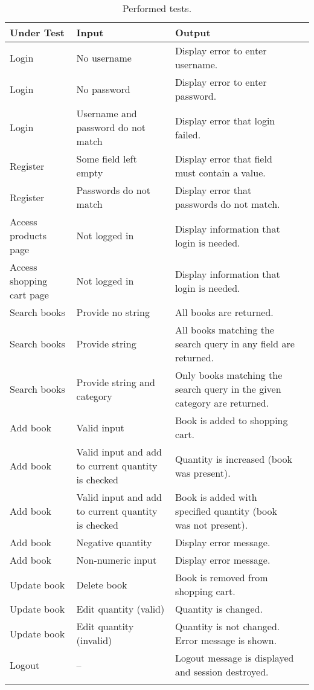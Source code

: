 \begin{longtable}{X X X X}
\hline Under Test & Input & Output \\
\hline 
\hline Login & No username & Display error to enter username. \\
\hline Login & No password & Display error to enter password. \\
\hline Login & Username and password do not match & Display error that login failed. \\
\hline Register & Some field left empty & Display error that field must contain a value. \\
\hline Register & Passwords do not match & Display error that passwords do not match. \\
\hline Access products page & Not logged in & Display information that login is needed. \\
\hline Access shopping cart page & Not logged in & Display information that login is needed. \\
\hline Search books & Provide no string & All books are returned. \\
\hline Search books & Provide string & All books matching the search query in any field are returned. \\
\hline Search books & Provide string and category & Only books matching the search query in the given category are returned. \\
\hline Add book & Valid input & Book is added to shopping cart. \\
\hline Add book & Valid input and add to current quantity is checked & Quantity is increased (book was present). \\
\hline Add book & Valid input and add to current quantity is checked & Book is added with specified quantity (book was not present). \\
\hline Add book & Negative quantity & Display error message. \\
\hline Add book & Non-numeric input & Display error message. \\
\hline Update book & Delete book & Book is removed from shopping cart. \\
\hline Update book & Edit quantity (valid) & Quantity is changed. \\
\hline Update book & Edit quantity (invalid) & Quantity is not changed. Error message is shown. \\
\hline Logout & -- & Logout message is displayed and session destroyed. \\
\caption{Performed tests.}
\end{longtable}